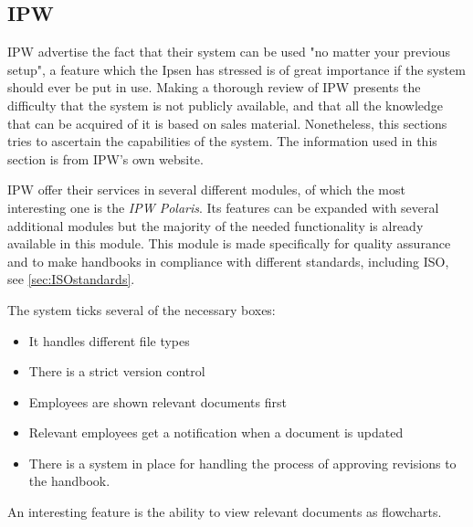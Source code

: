 \subsection{IPW}
IPW advertise the fact that their system can be used "no matter your previous setup", a feature which the Ipsen has stressed is of great importance if the system should ever be put in use.
Making a thorough review of IPW presents the difficulty that the system is not publicly available, and that all the knowledge that can be acquired of it is based on sales material.
Nonetheless, this sections tries to ascertain the capabilities of the system.
The information used in this section is from IPW's own website\cite{IPW}.

IPW offer their services in several different modules, of which the most interesting one is the \textit{IPW Polaris}.
Its features can be expanded with several additional modules but the majority of the needed functionality is already available in this module.
This module is made specifically for quality assurance and to make handbooks in compliance with different standards, including ISO, see \cref{sec:ISOstandards}.

The system ticks several of the necessary boxes: 

\begin{itemize}
        \item 
        It handles different file types
        \item 
        There is a strict version control
        \item 
        Employees are shown relevant documents first
        \item 
        Relevant employees get a notification when a document is updated
        \item 
        There is a system in place for handling the process of approving revisions to the handbook.
\end{itemize}

An interesting feature is the ability to view relevant documents as flowcharts.


